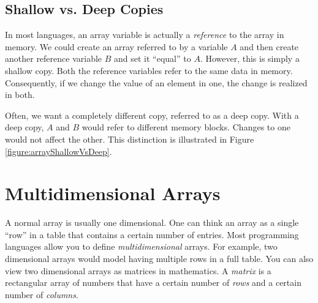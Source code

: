 \subsection{Shallow vs. Deep Copies}
\label{subsection:shallowVsDeep}

In most languages, an array variable is actually a \emph{reference}
to the array in memory.  We could create an array referred to 
by a variable $A$ and then create another reference variable
$B$ and set it ``equal'' to $A$.  However, this is simply a 
\gls{shallow copy}.  Both the reference variables refer to the
same data in memory.  Consequently, if we change the
value of an element in one, the change is realized in both.

Often, we want a completely different copy, referred to as a
\gls{deep copy}.  With a deep copy, $A$ and $B$ would 
refer to different memory blocks.  Changes to one would not
affect the other.  This distinction is illustrated in Figure
\ref{figure:arrayShallowVsDeep}.




\section{Multidimensional Arrays}

A normal array is usually one dimensional.  One can think an array
as a single ``row'' in a table that contains a certain number of entries.
Most programming languages allow you to define \emph{multidimensional}
arrays.  For example, two dimensional arrays would model having
multiple rows in a full table.  You can also view two dimensional 
arrays as matrices in mathematics.  A \emph{matrix} is a rectangular
array of numbers that have a certain number of \emph{rows} and
a certain number of \emph{columns}.  

